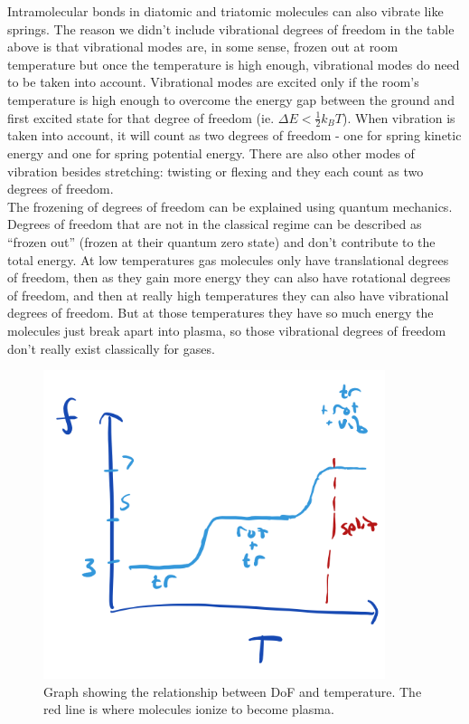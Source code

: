\documentclass[12pt, a4paper]{article}
\begin{document}
Intramolecular bonds in diatomic and triatomic molecules can also vibrate like springs. The reason we didn't include vibrational degrees of freedom in the table above is that vibrational modes are, in some sense, frozen out at room temperature but once the temperature is high enough, vibrational modes do need to be taken into account. Vibrational modes are excited only if the room's temperature is high enough to overcome the energy gap between the ground and first excited state for that degree of freedom (ie. $\Delta E < \frac12k_BT$). When vibration is taken into account, it will count as two degrees of freedom - one for spring kinetic energy and one for spring potential energy. There are also other modes of vibration besides stretching: twisting or flexing and they each count as two degrees of freedom. \\

The frozening of degrees of freedom can be explained using quantum mechanics. Degrees of freedom that are not in the classical regime can be described as ``frozen out'' (frozen at their quantum zero state) and don’t contribute to the total energy. At low temperatures gas molecules only have translational degrees of freedom, then as they gain more energy they can also have rotational degrees of freedom, and then at really high temperatures they can also have vibrational degrees of freedom. But at those temperatures they have so much energy the molecules just break apart into plasma, so those vibrational degrees of freedom don't really exist classically for gases.

\begin{figure}[H]
\centering
\includegraphics[width=100mm]{22.png}
\caption{Graph showing the relationship between DoF and temperature. The red line is where molecules ionize to become plasma.}
\end{figure}
\end{document}
